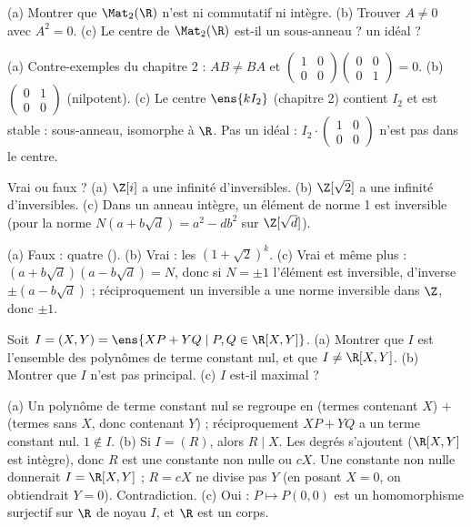 \begin{exo}
(a) Montrer que $\Mat_2(\R)$ n'est ni commutatif ni intègre. (b) Trouver $A\neq0$ avec $A^2=0$. (c) Le centre de $\Mat_2(\R)$ est-il un sous-anneau ? un idéal ?
\begin{corrige}
(a) Contre-exemples du chapitre 2 : $AB\neq BA$ et $\begin{pmatrix}1&0\\0&0\end{pmatrix}\begin{pmatrix}0&0\\0&1\end{pmatrix}=0$. (b) $\begin{pmatrix}0&1\\0&0\end{pmatrix}$ (nilpotent). (c) Le centre $\ens{kI_2}$ (chapitre 2) contient $I_2$ et est stable : sous-anneau, isomorphe à $\R$. Pas un idéal : $I_2\cdot\begin{pmatrix}1&0\\0&0\end{pmatrix}$ n'est pas dans le centre.
\end{corrige}
\end{exo}
\begin{exo}
Vrai ou faux ? (a) $\Z[i]$ a une infinité d'inversibles. (b) $\Z[\sqrt2]$ a une infinité d'inversibles. (c) Dans un anneau intègre, un élément de norme 1 est inversible (pour la norme $N(a+b\sqrt d)=a^2-db^2$ sur $\Z[\sqrt d]$).
\begin{corrige}
(a) Faux : quatre (). (b) Vrai : les $(1+\sqrt2)^k$. (c) Vrai et même plus : $(a+b\sqrt d)(a-b\sqrt d)=N$, donc si $N=\pm1$ l'élément est inversible, d'inverse $\pm(a-b\sqrt d)$ ; réciproquement un inversible a une norme inversible dans $\Z$, donc $\pm1$.
\end{corrige}
\end{exo}
\begin{exo}\label{exo-xy}
Soit $I=(X,Y)=\ens{XP+YQ\mid P,Q\in\R[X,Y]}$. (a) Montrer que $I$ est l'ensemble des polynômes de terme constant nul, et que $I\neq\R[X,Y]$. (b) Montrer que $I$ n'est pas principal. (c) $I$ est-il maximal ?
\begin{corrige}
(a) Un polynôme de terme constant nul se regroupe en (termes contenant $X$) $+$ (termes sans $X$, donc contenant $Y$) ; réciproquement $XP+YQ$ a un terme constant nul. $1\notin I$.
(b) Si $I=(R)$, alors $R\mid X$. Les degrés s'ajoutent ($\R[X,Y]$ est intègre), donc $R$ est une constante non nulle ou $cX$. Une constante non nulle donnerait $I=\R[X,Y]$ ; $R=cX$ ne divise pas $Y$ (en posant $X=0$, on obtiendrait $Y=0$). Contradiction.
(c) Oui : $P\mapsto P(0,0)$ est un homomorphisme surjectif sur $\R$ de noyau $I$, et $\R$ est un corps.
\end{corrige}
\end{exo}
